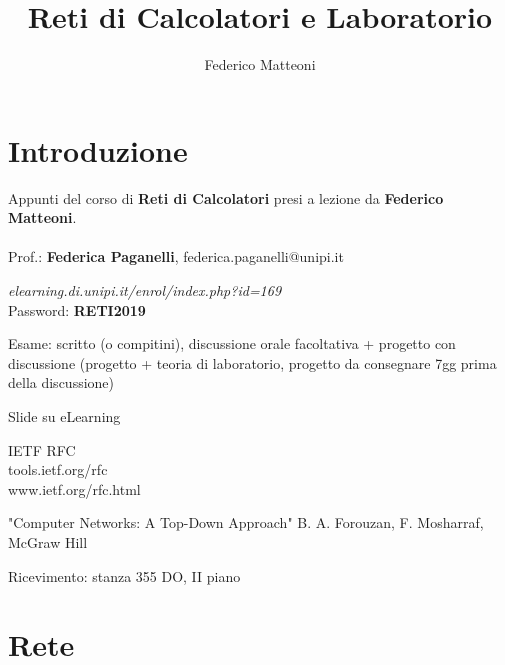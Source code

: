 \documentclass[10pt]{article}
\begin{document}
\title{Reti di Calcolatori e Laboratorio}
\author{Federico Matteoni}
\date{ }
\renewcommand*\contentsname{Indice}

\maketitle
\tableofcontents
\pagebreak
\section{Introduzione}
Appunti del corso di \textbf{Reti di Calcolatori} presi a lezione da \textbf{Federico Matteoni}.\\\\
Prof.: \textbf{Federica Paganelli}, federica.paganelli@unipi.it\\
\begin{list}{-}{Riferimenti web:}
\item \emph{elearning.di.unipi.it/enrol/index.php?id=169}\\Password: \textbf{RETI2019}
\end{list}
Esame: scritto (o compitini), discussione orale facoltativa + progetto con discussione (progetto + teoria di laboratorio, progetto da consegnare 7gg prima della discussione)\\
\begin{list}{-}{Libri e materiale didattico:}
\item Slide su eLearning
\item IETF RFC\\tools.ietf.org/rfc\\www.ietf.org/rfc.html
\item "Computer Networks: A Top-Down Approach" B. A. Forouzan, F. Mosharraf, McGraw Hill
\end{list}
Ricevimento: stanza 355 DO, II piano

\section{Rete}
\end{document}
